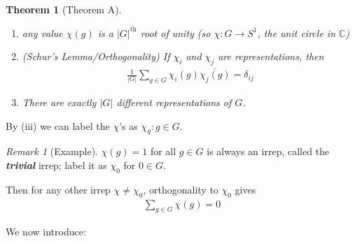 \documentclass[]{article}
\theoremstyle{custhm}
\theoremstyle{cusdef}
\theoremstyle{custhm}
\theoremstyle{custhm}
\theoremstyle{custhm}
\theoremstyle{custhm}
\newtheorem*{theorem*}{Theorem}
\theoremstyle{cusdef}
\theoremstyle{remark}
\newtheorem*{remark*}{Remark}
\newcommand{\C}{\mathbb{C}}
\newcommand{\ra}{\rightarrow}
\newcommand{\undf}[1]{\textit{\textbf{#1}}}
\begin{document}
\begin{theorem*}[Theorem A]\ 
\begin{enumerate}[label=(\roman*)]
	\item any value $\chi(g)$ is a $|G|^{\textrm{th}}$ root of unity (so $\chi : G\ra S^1$, the unit circle in $\C$)
	\item (Schur's Lemma/Orthogonality) If $\chi_i$ and $\chi_j$ are representations, then
	\begin{align*}
		\frac{1}{|G|} \sum_{g\in G} \chi_i(g)\overline{\chi_j(g)} = \delta_{ij}
	\end{align*}
	\item There are exactly $|G|$ different representations of $G$.
\end{enumerate}
\end{theorem*}

By (iii) we can label the $\chi$'s as $\chi_g: g\in G$.

\begin{remark*}[Example]
$\chi(g) = 1$ for all $g\in G$ is always an irrep, called the \undf{trivial} irrep; label it as $\chi_0$ for $0\in G$.

Then for any other irrep $\chi\ne \chi_0$, orthogonality to $\chi_0$ gives
\begin{align*}
	\sum_{g\in G}\chi(g) = 0
\end{align*}
\end{remark*}

We now introduce:
\end{document}
